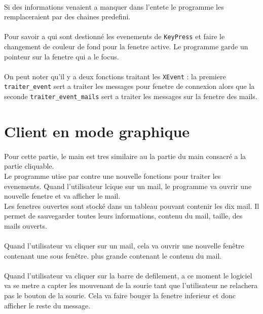 \documentclass[a4paper, titlepage, oneside, 12pt]{article}%
\begin{document}
\paragraph{}
Si des informations venaient a manquer dans l'entete le programme les remplaceraient par des chaines predefini. 

\paragraph{}
Pour savoir a qui sont destionné les evenements de \texttt{KeyPress} et faire le changement de couleur de fond pour la fenetre active. Le programme garde un pointeur sur la fenetre qui a le focus.

\paragraph{}
On peut noter qu'il y a deux fonctions traitant les \texttt{XEvent} : la premiere \texttt{traiter\_event} sert a traiter les messages pour fenetre de connexion alors que la seconde \texttt{traiter\_event\_mails} sert a traiter les messages sur la fenetre des mails.

\section{Client en mode graphique}
\paragraph{}
Pour cette partie, le main est tres similaire au la partie du main consacré a la partie cliquable.\\
Le programme utise par contre une nouvelle fonctions pour traiter les evenements. Quand l'utilisateur lcique sur un mail, le programme va ouvrir une nouvelle fenetre et va afficher le mail.\\
Les fenetres ouvertes sont stocké dans un tableau pouvant contenir les dix mail. Il permet de  sauvegarder toutes leurs informations, contenu du mail, taille, des mails ouverts.

\paragraph{}
Quand l'utilisateur va cliquer sur un mail, cela va ouvrir une nouvelle fenêtre contenant une sous fenêtre. plus grande contenant le contenu du mail.

\paragraph{}
Quand l'utilisateur va cliquer sur la barre de defilement, a ce moment le logiciel va se metre a capter les mouvenant de la sourie tant que l'utilisateur ne relachera pas le bouton de la sourie. Cela va faire bouger la fenetre inferieur et donc afficher le reste du message. \\
\end{document}
